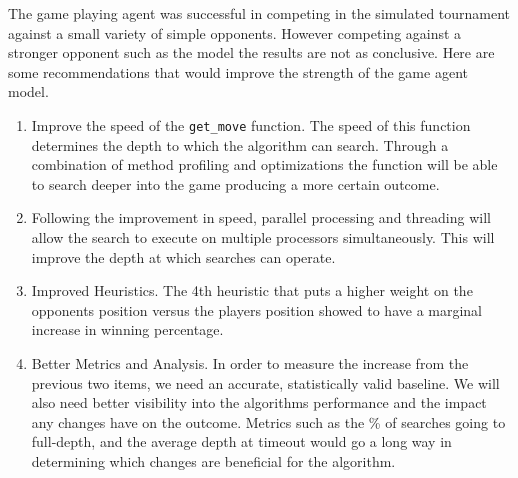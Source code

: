\documentclass{article}
\begin{document}
The game playing agent was successful in competing in the simulated tournament against
a small variety of simple opponents. However competing against a stronger opponent such as
the \texttt{} model the results are not as conclusive. Here are
some recommendations that would improve the strength of the game agent model.\newline
\begin{enumerate}
\item Improve the speed of the \verb|get_move| function. The speed of this function determines
the depth to which the algorithm can search. Through a combination of method profiling and optimizations
the function will be able to search deeper into the game producing a more certain outcome.

\item Following the improvement in speed, parallel processing and threading will allow the search to
execute on multiple processors simultaneously. This will improve the depth at which searches can operate.

\item Improved Heuristics. The 4th heuristic that puts a higher weight on the opponents position versus the
players position showed to have a marginal increase in winning percentage.

\item Better Metrics and Analysis. In order to measure the increase from the previous two items, we need an
accurate, statistically valid baseline. We will also need better visibility into the algorithms performance
and the impact any changes have on the outcome. Metrics such as the \% of searches going to full-depth, and the
average depth at timeout would go a long way in determining which changes are beneficial for the algorithm.
\end{enumerate}
\end{document}
